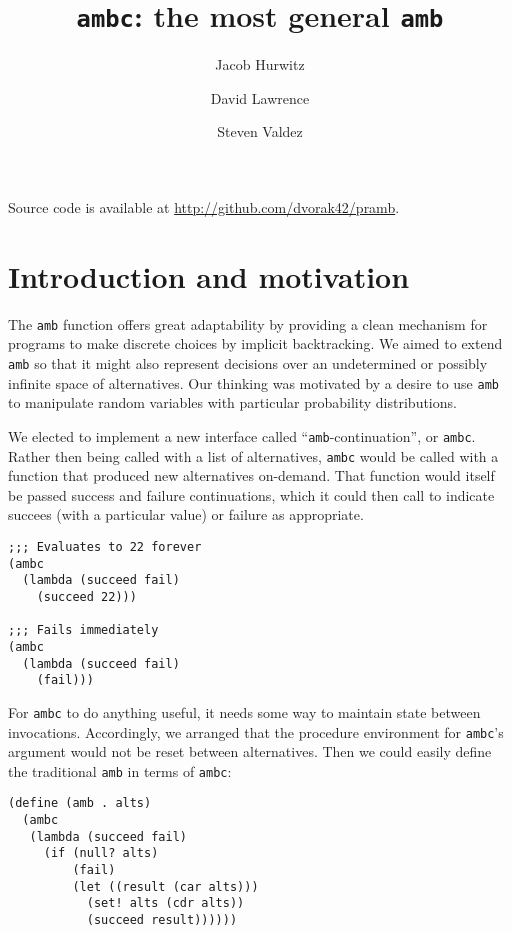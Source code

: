 \documentclass{article}
\title{\texttt{ambc}: the most general \texttt{amb}}
\author{Jacob Hurwitz \and David Lawrence \and Steven Valdez}
\begin{document}
\maketitle

\begin{center}
  Source code is available at \url{http://github.com/dvorak42/pramb}.
\end{center}

\section{Introduction and motivation}

The \texttt{amb} function offers great adaptability by providing a
clean mechanism for programs to make discrete choices by implicit
backtracking.  We aimed to extend \texttt{amb} so that it might also
represent decisions over an undetermined or possibly infinite space of
alternatives.  Our thinking was motivated by a desire to use
\texttt{amb} to manipulate random variables with particular
probability distributions.

We elected to implement a new interface called
``\texttt{amb}-continuation'', or \texttt{ambc}.  Rather then being
called with a list of alternatives, \texttt{ambc} would be called with
a function that produced new alternatives on-demand.  That function
would itself be passed success and failure continuations, which it
could then call to indicate succees (with a particular value) or
failure as appropriate.

\begin{lstlisting}
;;; Evaluates to 22 forever
(ambc
  (lambda (succeed fail)
    (succeed 22)))

;;; Fails immediately
(ambc
  (lambda (succeed fail)
    (fail)))
\end{lstlisting}

For \texttt{ambc} to do anything useful, it needs some way to maintain
state between invocations.  Accordingly, we arranged that the
procedure environment for \texttt{ambc}'s argument would not be reset
between alternatives.  Then we could easily define the traditional
\texttt{amb} in terms of \texttt{ambc}:

\begin{lstlisting}
(define (amb . alts)
  (ambc
   (lambda (succeed fail)
     (if (null? alts)
         (fail)
         (let ((result (car alts)))
           (set! alts (cdr alts))
           (succeed result))))))
\end{lstlisting}
\end{document}
